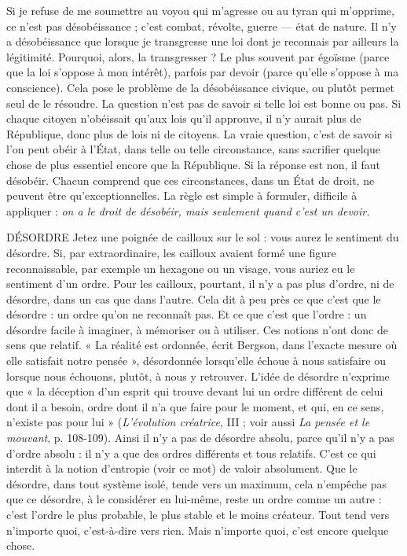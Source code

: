 Si je refuse de me soumettre au voyou qui m’agresse ou au tyran qui
m'opprime, ce n’est pas désobéissance ; c’est combat, révolte, guerre — état de
nature. Il n’y a désobéissance que lorsque je transgresse une loi dont je reconnais
par ailleurs la légitimité. Pourquoi, alors, la transgresser ? Le plus souvent
par égoïsme (parce que la loi s’oppose à mon intérêt), parfois par devoir (parce
qu'elle s'oppose à ma conscience). Cela pose le problème de la désobéissance
civique, ou plutôt permet seul de le résoudre. La question n’est pas de savoir si
telle loi est bonne ou pas. Si chaque citoyen n’obéissait qu'aux lois qu'il
approuve, il n’y aurait plus de République, donc plus de lois ni de citoyens. La
vraie question, c’est de savoir si l’on peut obéir à l'État, dans telle ou telle circonstance,
sans sacrifier quelque chose de plus essentiel encore que la République.
Si la réponse est non, il faut désobéir. Chacun comprend que ces circonstances,
dans un État de droit, ne peuvent être qu’exceptionnelles. La règle
est simple à formuler, difficile à appliquer : {\it on a le droit de désobéir, mais
seulement quand c'est un devoir.}

DÉSORDRE Jetez une poignée de cailloux sur le sol : vous aurez le sentiment
du désordre. Si, par extraordinaire, les cailloux avaient
formé une figure reconnaissable, par exemple un hexagone ou un visage, vous
auriez eu le sentiment d’un ordre. Pour les cailloux, pourtant, il n’y a pas plus
d'ordre, ni de désordre, dans un cas que dans l’autre. Cela dit à peu près ce que
c'est que le désordre : un ordre qu’on ne reconnaît pas. Et ce que c’est que
l’ordre : un désordre facile à imaginer, à mémoriser ou à utiliser. Ces notions
n'ont donc de sens que relatif. « La réalité est ordonnée, écrit Bergson, dans
l’exacte mesure où elle satisfait notre pensée », désordonnée lorsqu’elle échoue
à nous satisfaire ou lorsque nous échouons, plutôt, à nous y retrouver. L'idée
de désordre n’exprime que « la déception d’un esprit qui trouve devant lui un
ordre différent de celui dont il a besoin, ordre dont il n’a que faire pour le
moment, et qui, en ce sens, n'existe pas pour lui » ({\it L'évolution créatrice}, III ;
voir aussi {\it La pensée et le mouvant}, p. 108-109). Ainsi il n’y a pas de désordre
absolu, parce qu’il n’y a pas d’ordre absolu : il n’y a que des ordres différents et
tous relatifs. C’est ce qui interdit à la notion d’entropie (voir ce mot) de valoir
absolument. Que le désordre, dans tout système isolé, tende vers un maximum,
cela n'empêche pas que ce désordre, à le considérer en lui-même, reste un ordre
comme un autre : c’est l’ordre le plus probable, le plus stable et le moins créateur.
Tout tend vers n’importe quoi, c’est-à-dire vers rien. Mais n'importe
quoi, c’est encore quelque chose.

